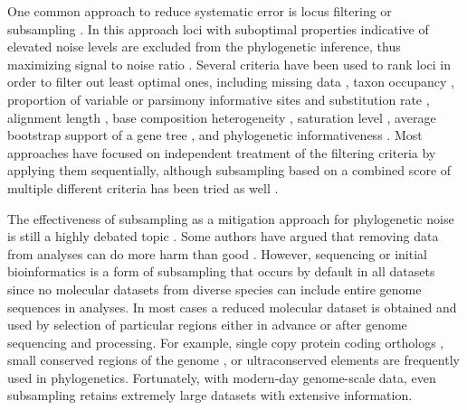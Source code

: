 \documentclass[../main.tex]{subfiles}
\begin{document}
One common approach to reduce systematic error is locus filtering or subsampling \citep{Edwards2016-gr, Gilbert2018-im, Smith2022-pj}. In this approach loci with suboptimal properties indicative of elevated noise levels are excluded from the phylogenetic inference, thus maximizing signal to noise ratio \citep{Edwards2016-gr,Chen2015-tr,Simmons2016-pe, Molloy2018-tr}. Several criteria have been used to rank loci in order to filter out least optimal ones, including missing data \citep{Mongiardino_Koch2021-ai, Evangelista2021-cr, Kocot2017-wt, Molloy2018-tr, Brown2017-hn, Herrando-Moraira2018-vw}, taxon occupancy \citep{Mongiardino_Koch2021-ai, Borowiec2015-mr, Evangelista2021-cr, Gernandt2018-qn, Herrando-Moraira2018-vw,Lemmon2009-tj, Young2016-mc, Dietrich2017-ix}, proportion of variable or parsimony informative sites and substitution rate \citep{Mongiardino_Koch2021-ai, Borowiec2015-mr, Whelan2015-gk, Herrando-Moraira2018-vw, Gernandt2018-qn}, alignment length \citep{Mongiardino_Koch2021-ai, Evangelista2021-cr, Brown2017-hn, Gernandt2018-qn}, base composition heterogeneity \citep{Mongiardino_Koch2021-ai, Evangelista2021-cr,Kocot2017-wt,Whelan2015-gk}, saturation level \citep{Mongiardino_Koch2021-ai, Borowiec2015-mr, Kocot2017-wt, Herrando-Moraira2018-vw}, average bootstrap support of a gene tree \citep{Mongiardino_Koch2021-ai, Borowiec2015-mr, Herrando-Moraira2018-vw}, and phylogenetic informativeness \citep{Mongiardino_Koch2021-ai, Herrando-Moraira2018-vw, Townsend2007-zi}. Most approaches have focused on independent treatment of the filtering criteria by applying them sequentially, although subsampling based on a combined score of multiple different criteria has been tried as well \citep{Herrando-Moraira2018-vw}.

The effectiveness of subsampling as a mitigation approach for phylogenetic noise is still a highly debated topic \citep{Simmons2016-pe, Molloy2018-tr}. Some authors have argued that removing data from analyses can do more harm than good \citep{Chan2020-bz}. However, sequencing or initial bioinformatics is a form of subsampling that occurs by default in all datasets since no molecular datasets from diverse species can include entire genome sequences in analyses. In most cases a reduced molecular dataset is obtained and used by selection of particular regions either in advance or after genome sequencing and processing.
For example, single copy protein coding orthologs \citep{Simao2015-eh, Zhang2019-ok}, small conserved regions of the genome \citep{Lemmon2012-or, Schwartz2015-wg, Literman2021-yc}, or ultraconserved elements \citep{McCormack2012-tz, Zhang2019-ok, Chakrabarty2017-ie, Esselstyn2017-uc} are frequently used in phylogenetics.
Fortunately, with modern-day genome-scale data, even subsampling retains extremely large datasets with extensive information.
\end{document}
